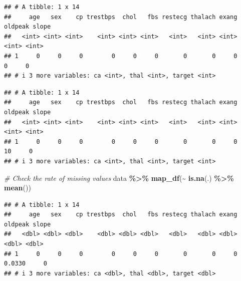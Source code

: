 \documentclass[
]{book}
\newenvironment{Shaded}{\begin{snugshade}}{\end{snugshade}}
\newcommand{\AttributeTok}[1]{\textcolor[rgb]{0.13,0.29,0.53}{#1}}
\newcommand{\CommentTok}[1]{\textcolor[rgb]{0.56,0.35,0.01}{\textit{#1}}}
\newcommand{\ConstantTok}[1]{\textcolor[rgb]{0.56,0.35,0.01}{#1}}
\newcommand{\DecValTok}[1]{\textcolor[rgb]{0.00,0.00,0.81}{#1}}
\newcommand{\FunctionTok}[1]{\textcolor[rgb]{0.13,0.29,0.53}{\textbf{#1}}}
\newcommand{\NormalTok}[1]{#1}
\newcommand{\OtherTok}[1]{\textcolor[rgb]{0.56,0.35,0.01}{#1}}
\newcommand{\SpecialCharTok}[1]{\textcolor[rgb]{0.81,0.36,0.00}{\textbf{#1}}}
\begin{document}
\begin{verbatim}
## # A tibble: 1 x 14
##     age   sex    cp trestbps  chol   fbs restecg thalach exang oldpeak slope
##   <int> <int> <int>    <int> <int> <int>   <int>   <int> <int>   <int> <int>
## 1     0     0     0        0     0     0       0       0     0       0     0
## # i 3 more variables: ca <int>, thal <int>, target <int>
\end{verbatim}

\begin{Shaded}
\end{Shaded}

\begin{verbatim}
## # A tibble: 1 x 14
##     age   sex    cp trestbps  chol   fbs restecg thalach exang oldpeak slope
##   <int> <int> <int>    <int> <int> <int>   <int>   <int> <int>   <int> <int>
## 1     0     0     0        0     0     0       0       0     0      10     0
## # i 3 more variables: ca <int>, thal <int>, target <int>
\end{verbatim}

\begin{Shaded}
\begin{Highlighting}[]
\CommentTok{\# Check the rate of missing values}
\NormalTok{data }\SpecialCharTok{\%\textgreater{}\%}
  \FunctionTok{map\_df}\NormalTok{(}\SpecialCharTok{\textasciitilde{}} \FunctionTok{is.na}\NormalTok{(.) }\SpecialCharTok{\%\textgreater{}\%} \FunctionTok{mean}\NormalTok{())}
\end{Highlighting}
\end{Shaded}

\begin{verbatim}
## # A tibble: 1 x 14
##     age   sex    cp trestbps  chol   fbs restecg thalach exang oldpeak slope
##   <dbl> <dbl> <dbl>    <dbl> <dbl> <dbl>   <dbl>   <dbl> <dbl>   <dbl> <dbl>
## 1     0     0     0        0     0     0       0       0     0  0.0330     0
## # i 3 more variables: ca <dbl>, thal <dbl>, target <dbl>
\end{verbatim}
\end{document}
